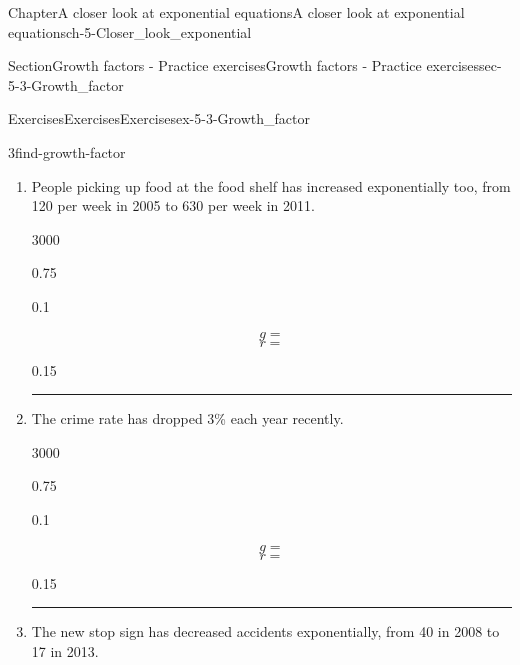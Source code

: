 \documentclass[twoside,11pt,]{book}
\newlength{\workspacestrutwidth}
\numberwithin{equation}{section}
\begin{document}
\begin{chapterptx}{Chapter}{A closer look at exponential equations}{}{A closer look at exponential equations}{}{}{ch-5-Closer_look_exponential}
\begin{sectionptx}{Section}{Growth factors - Practice exercises}{}{Growth factors - Practice exercises}{}{}{sec-5-3-Growth_factor}
\begin{exercises-subsection-numberless}{Exercises}{Exercises}{}{Exercises}{}{}{ex-5-3-Growth_factor}
\begin{divisionexercise}{3}{}{}{find-growth-factor}
\begin{enumerate}[label=(\alph*),ref=\alph*]
\begin{sidebyside}{3}{0}{0}{0}
\begin{sbspanel}{0.1}
\begin{equation*}
r =
\end{equation*}
%
\end{sbspanel}%
\begin{sbspanel}{0.15}%
\par
%
\end{sbspanel}%
\end{sidebyside}%
\par\rule{\workspacestrutwidth}{1.75cm}%
\item{}People picking up food at the food shelf has increased exponentially too, from 120 per week in 2005 to 630 per week in 2011.%
\begin{sidebyside}{3}{0}{0}{0}%
\begin{sbspanel}{0.75}%
%
\end{sbspanel}%
\begin{sbspanel}{0.1}%
\par
%
\begin{equation*}
g=
\end{equation*}
%
\begin{equation*}
r =
\end{equation*}
%
\end{sbspanel}%
\begin{sbspanel}{0.15}%
\par
%
\end{sbspanel}%
\end{sidebyside}%
\par\rule{\workspacestrutwidth}{1.75cm}%
\item{}The crime rate has dropped 3\% each year recently.%
\begin{sidebyside}{3}{0}{0}{0}%
\begin{sbspanel}{0.75}%
%
\end{sbspanel}%
\begin{sbspanel}{0.1}%
\par
%
\begin{equation*}
g=
\end{equation*}
%
\begin{equation*}
r =
\end{equation*}
%
\end{sbspanel}%
\begin{sbspanel}{0.15}%
\par
%
\end{sbspanel}%
\end{sidebyside}%
\par\rule{\workspacestrutwidth}{1.75cm}%
\item{}The new stop sign has decreased accidents exponentially, from 40 in 2008 to 17 in 2013.%

\end{enumerate}
\end{divisionexercise}
\end{exercises-subsection-numberless}
\end{sectionptx}
\end{chapterptx}
\end{document}
